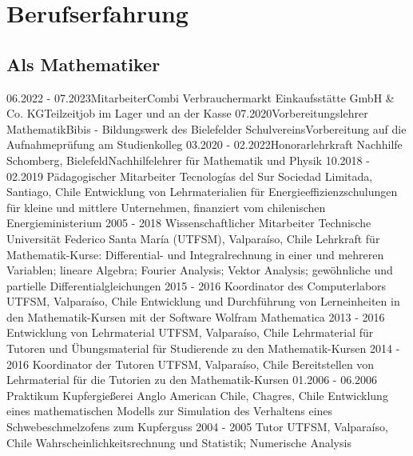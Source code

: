 \documentclass[a4paper]{cv-class}
\let\oldincludegraphics\includegraphics
\renewcommand\includegraphics[2][]{%
  \oldincludegraphics[#1,max width=10cm,max height=\textheight]{#2}
}
\begin{document}
\begin{aside}
%   
%   
\end{aside}

\vspace{0.5cm}

\section{Berufserfahrung}
\subsection{Als Mathematiker}
\begin{entrylist}
\entry
{06.2022 - 07.2023}{Mitarbeiter}{Combi Verbrauchermarkt
Einkaufsstätte GmbH \& Co. KG}{Teilzeitjob im Lager und an der Kasse}
\entry
{07.2020}{Vorbereitungslehrer Mathematik}{Bibis - Bildungswerk des
Bielefelder Schulvereins}{Vorbereitung auf die Aufnahmeprüfung
am Studienkolleg}
\entry
{03.2020 - 02.2022}{Honorarlehrkraft} {Nachhilfe Schomberg, Bielefeld}{Nachhilfelehrer für Mathematik und Physik}
\entry
    {10.2018 - 02.2019}
    {Pädagogischer Mitarbeiter}
    {Tecnologías del Sur Sociedad Limitada, Santiago, Chile}
    {Entwicklung von Lehrmaterialien für Energieeffizienzschulungen für kleine und mittlere Unternehmen, finanziert vom chilenischen Energieministerium}
\entry
    {2005 - 2018}
    {Wissenschaftlicher Mitarbeiter}
    {Technische Universität Federico Santa María (UTFSM), Valpara\'iso, Chile}
    {Lehrkraft für Mathematik-Kurse: Differential- und Integralrechnung in einer und mehreren Variablen; lineare Algebra; Fourier Analysis; Vektor Analysis; gewöhnliche und partielle Differentialgleichungen}
 \entry
    {2015 - 2016}
    {Koordinator des Computerlabors}
    {UTFSM, Valparaíso, Chile}
    {Entwicklung und Durchführung von Lerneinheiten in den Mathematik-Kursen  mit der Software Wolfram Mathematica}
  \entry
    {2013 - 2016}
    {Entwicklung von Lehrmaterial}
    {UTFSM, Valparaíso, Chile}
    {Lehrmaterial für Tutoren und Übungsmaterial für Studierende zu den Mathematik-Kursen}
  \entry
    {2014 - 2016}
    {Koordinator der Tutoren}
    {UTFSM, Valparaíso, Chile}
    {Bereitstellen von Lehrmaterial für die Tutorien zu den Mathematik-Kursen}
  \entry
    {01.2006 - 06.2006}
    {Praktikum}
    {Kupfergie{\ss}erei Anglo American Chile, Chagres, Chile}
    {Entwicklung eines mathematischen Modells zur Simulation des Verhaltens eines Schwebeschmelzofens zum Kupferguss}
\entry
   {2004 - 2005}
   {Tutor}
   {UTFSM, Valpara\'iso, Chile}
   {Wahrscheinlichkeitsrechnung und Statistik; Numerische Analysis}
\end{entrylist}%
\end{document}
